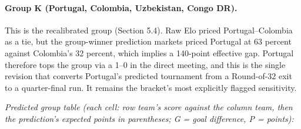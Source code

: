 \documentclass[11pt,letterpaper]{article}
\begin{document}


\paragraph{Group K (Portugal, Colombia, Uzbekistan, Congo DR).} This is the recalibrated group (Section 5.4). Raw Elo priced Portugal--Colombia as a tie, but the group-winner prediction markets priced Portugal at 63 percent against Colombia's 32 percent, which implies a 140-point effective gap. Portugal therefore tops the group via a 1--0 in the direct meeting, and this is the single revision that converts Portugal's predicted tournament from a Round-of-32 exit to a quarter-final run. It remains the bracket's most explicitly flagged sensitivity.

\noindent\textit{\footnotesize Predicted group table (each cell: row team's score against the column team, then the prediction's expected points in parentheses; G = goal difference, P = points):}
\end{document}
